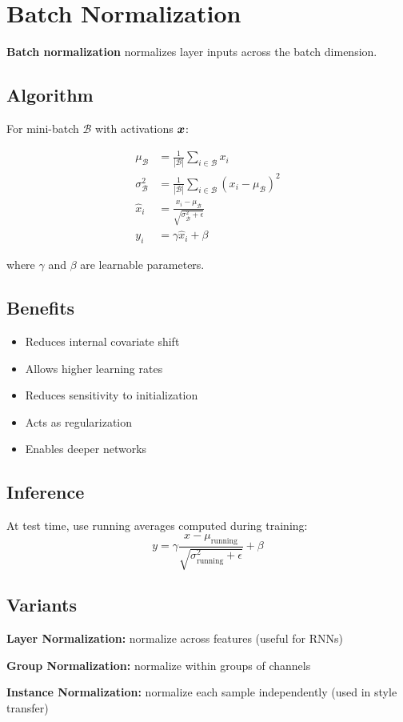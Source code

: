 
\section{Batch Normalization}
\label{sec:batch-normalization}

\textbf{Batch normalization} normalizes layer inputs across the batch dimension.

\subsection{Algorithm}

For mini-batch $\mathcal{B}$ with activations $\boldsymbol{x}$:

\begin{align}
\mu_{\mathcal{B}} &= \frac{1}{|\mathcal{B}|} \sum_{i \in \mathcal{B}} x_i \\
\sigma^2_{\mathcal{B}} &= \frac{1}{|\mathcal{B}|} \sum_{i \in \mathcal{B}} (x_i - \mu_{\mathcal{B}})^2 \\
\hat{x}_i &= \frac{x_i - \mu_{\mathcal{B}}}{\sqrt{\sigma^2_{\mathcal{B}} + \epsilon}} \\
y_i &= \gamma \hat{x}_i + \beta
\end{align}

where $\gamma$ and $\beta$ are learnable parameters.

\subsection{Benefits}

\begin{itemize}
    \item Reduces internal covariate shift
    \item Allows higher learning rates
    \item Reduces sensitivity to initialization
    \item Acts as regularization
    \item Enables deeper networks
\end{itemize}

\subsection{Inference}

At test time, use running averages computed during training:
\begin{equation}
y = \gamma \frac{x - \mu_{\text{running}}}{\sqrt{\sigma^2_{\text{running}} + \epsilon}} + \beta
\end{equation}

\subsection{Variants}

\textbf{Layer Normalization:} normalize across features (useful for RNNs)

\textbf{Group Normalization:} normalize within groups of channels

\textbf{Instance Normalization:} normalize each sample independently (used in style transfer)

